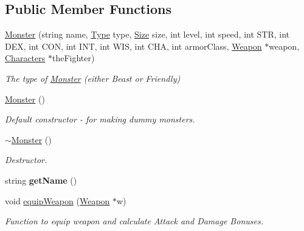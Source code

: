 \subsection*{Public Member Functions}
\begin{DoxyCompactItemize}
\item 
\hyperlink{class_monster_ae0c9e6b3fe1421e7a5367e50fa182d93}{Monster} (string name, \hyperlink{_entity_8h_a1d1cfd8ffb84e947f82999c682b666a7}{Type} type, \hyperlink{_entity_8h_a1c40db1d9b56c27240e420765695f1c4}{Size} size, int level, int speed, int S\+TR, int D\+EX, int C\+ON, int I\+NT, int W\+IS, int C\+HA, int armor\+Class, \hyperlink{class_weapon}{Weapon} $\ast$weapon, \hyperlink{class_characters}{Characters} $\ast$the\+Fighter)
\begin{DoxyCompactList}\small\item\em The type of \hyperlink{class_monster}{Monster} (either Beast or Friendly) \end{DoxyCompactList}\item 
\hypertarget{class_monster_a3dfc253fbec8331d42ac13c20bf9425f}{}\label{class_monster_a3dfc253fbec8331d42ac13c20bf9425f} 
\hyperlink{class_monster_a3dfc253fbec8331d42ac13c20bf9425f}{Monster} ()
\begin{DoxyCompactList}\small\item\em Default constructor -\/ for making dummy monsters. \end{DoxyCompactList}\item 
\hypertarget{class_monster_a21619ba1759b910cd2fd50d858aab338}{}\label{class_monster_a21619ba1759b910cd2fd50d858aab338} 
\hyperlink{class_monster_a21619ba1759b910cd2fd50d858aab338}{$\sim$\+Monster} ()
\begin{DoxyCompactList}\small\item\em Destructor. \end{DoxyCompactList}\item 
\hypertarget{class_monster_a6147ef9584d386252ec3b8d828701c85}{}\label{class_monster_a6147ef9584d386252ec3b8d828701c85} 
string {\bfseries get\+Name} ()
\item 
\hypertarget{class_monster_a89f0117018eb1fdd71d22fab070030e0}{}\label{class_monster_a89f0117018eb1fdd71d22fab070030e0} 
void \hyperlink{class_monster_a89f0117018eb1fdd71d22fab070030e0}{equip\+Weapon} (\hyperlink{class_weapon}{Weapon} $\ast$w)
\begin{DoxyCompactList}\small\item\em Function to equip weapon and calculate Attack and Damage Bonuses. \end{DoxyCompactList}\item 

\end{DoxyCompactItemize}
